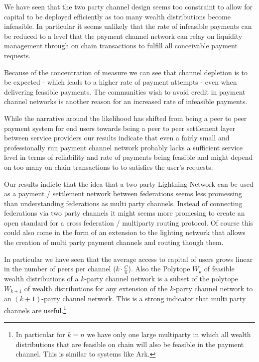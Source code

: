 \documentclass[10pt,twocolumn]{article}
\begin{document}
We have seen that the two party channel design seems too constraint to allow for capital to be deployed efficiently as too many wealth distributions become infeasible.
In particular it seems unlikely that the rate of infeasible payments can be reduced to a level that the payment channel network can relay on liquidity management through on chain transactions to fulfill all conceivable payment requests.


Because of the concentration of measure we can see that channel depletion is to be expected - which leads to a higher rate of payment attempts - even when delivering feasible payments.
The communities wish to avoid credit in payment channel networks is another reason for an increased rate of infeasible payments. 

While the narrative around the likelihood has shifted from being a peer to peer payment system for end users towards being a peer to peer settlement layer between service providers our results indicate that even a fairly small and professionally run payment channel network probably lacks a sufficient service level in terms of reliability and rate of payments being feasible and might depend on too many on chain transactions to to satisfies the user's requests.

Our results indicte that the idea that a two party Lightning Network can be used as a payment / settlement network between federations seems less promessing than understanding federations as multi party channels.
Instead of connecting federations via two party channels it might seems more promesing to create an open standard for a cross federation / multiparty routing protocol.
Of course this could also come in the form of an extension to the lighting network that allows the creation of multi party payment channels and routing though them. 

In particular we have seen that the average access to capital of users grows linear in the number of peers per channel ($k\cdot\frac{C}{n}$).
Also the Polytope $W_k$ of feasible wealth distributions of a $k$-party channel network is a subset of the polytope $W_{k+1}$ of wealth distributions for any extension of the $k$-party channel network to an $(k+1)$-party channel network.
This is a strong indicator that multi party channels are useful.\footnote{In particular for $k=n$ we have only one large multiparty in which all wealth distributions that are feasible on chain will also be feasible in the payment channel. This is similar to systems like Ark.}

\end{document}
